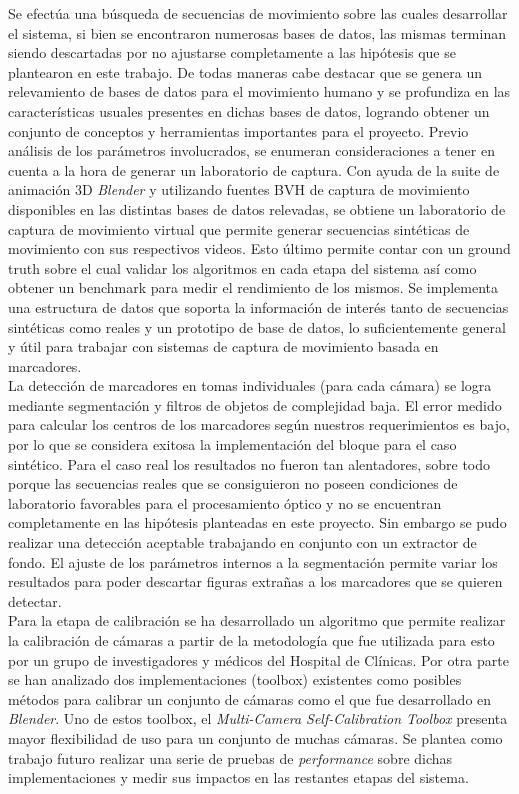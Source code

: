 Se efectúa una búsqueda de secuencias de movimiento sobre las cuales desarrollar el sistema, si bien se encontraron numerosas bases de datos, las mismas terminan siendo descartadas por no ajustarse completamente  a las hipótesis que se plantearon en este trabajo. De todas maneras cabe destacar que se genera un relevamiento de bases de datos para el movimiento humano y se profundiza en las características usuales presentes en dichas bases de datos, logrando obtener un conjunto de conceptos y herramientas importantes para el proyecto. Previo análisis de los parámetros involucrados, se enumeran consideraciones a tener en cuenta a la hora de generar un laboratorio de captura.
Con ayuda de la suite de animación 3D \emph{Blender} y utilizando fuentes BVH de captura de movimiento disponibles en las distintas bases de datos relevadas, se obtiene un laboratorio de captura de movimiento virtual que permite generar secuencias sintéticas de movimiento con sus respectivos videos. Esto último permite contar con un ground truth sobre el cual validar los algoritmos en cada etapa del sistema así como obtener un benchmark para medir el rendimiento de los mismos.
Se implementa una estructura de datos que soporta la información de interés tanto de secuencias sintéticas como reales y un prototipo de base de datos, lo suficientemente general y útil para trabajar con sistemas de captura de movimiento basada en marcadores.\\ 


La detección de marcadores en tomas individuales (para cada cámara) se logra mediante segmentación y filtros de objetos de complejidad baja. El error medido para calcular los centros de los marcadores según nuestros requerimientos es bajo, por lo que se considera exitosa la implementación del bloque para el caso sintético. Para el caso real los resultados no fueron tan alentadores, sobre todo porque las secuencias reales que se consiguieron no poseen condiciones de laboratorio favorables para el procesamiento óptico y no se encuentran completamente en las hipótesis planteadas en este proyecto. Sin embargo se pudo realizar una detección aceptable trabajando en conjunto con un extractor de fondo. El ajuste de los parámetros internos a la segmentación permite variar los resultados para poder descartar figuras extrañas a los marcadores que se quieren detectar.\\ 

Para la etapa de calibración se ha desarrollado un algoritmo que permite realizar la calibración de cámaras a partir de la metodología que fue utilizada para esto por un grupo de investigadores y médicos del Hospital de Clínicas. Por otra parte se han analizado dos implementaciones (toolbox) existentes como posibles métodos para calibrar un conjunto de cámaras como el que fue desarrollado en \emph{Blender}. Uno de estos toolbox, el \textit{Multi-Camera Self-Calibration Toolbox} presenta mayor flexibilidad de uso para un conjunto de muchas cámaras. Se plantea como trabajo futuro realizar una serie de pruebas de \textit{performance} sobre dichas implementaciones y medir sus impactos en las restantes etapas del sistema.\\

